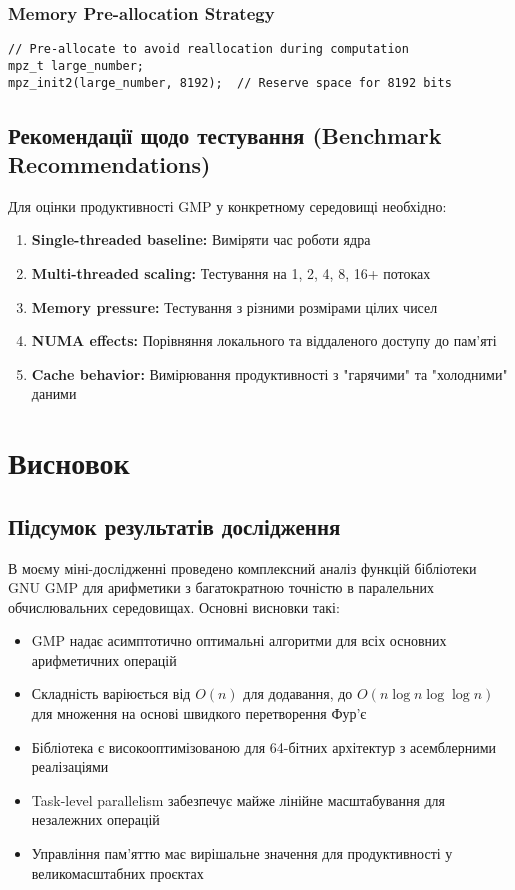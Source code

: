 \subsubsection{Memory Pre-allocation Strategy}
\begin{verbatim}
// Pre-allocate to avoid reallocation during computation
mpz_t large_number;
mpz_init2(large_number, 8192);  // Reserve space for 8192 bits
\end{verbatim}

\subsection{Рекомендації щодо тестування (Benchmark Recommendations)}

Для оцінки продуктивності GMP у конкретному середовищі необхідно:

\begin{enumerate}
    \item \textbf{Single-threaded baseline:} Виміряти час роботи ядра
    \item \textbf{Multi-threaded scaling:} Тестування на 1, 2, 4, 8, 16+ потоках
    \item \textbf{Memory pressure:} Тестування з різними розмірами цілих чисел
    \item \textbf{NUMA effects:} Порівняння локального та віддаленого доступу до пам'яті
    \item \textbf{Cache behavior:} Вимірювання продуктивності з "гарячими"{} та "холодними"{} даними
\end{enumerate}

\newpage
\section{Висновок}

\subsection{Підсумок результатів дослідження}
В моєму міні-дослідженні проведено комплексний аналіз функцій бібліотеки GNU GMP для арифметики з багатократною 
точністю в паралельних обчислювальних середовищах. Основні висновки такі:
\begin{itemize}
    \item GMP надає асимптотично оптимальні алгоритми для всіх основних арифметичних операцій
    \item Складність варіюється від $O(n)$ для додавання, до $O(n \log n \log \log n)$ для множення на основі швидкого перетворення Фур'є
    \item Бібліотека є високооптимізованою для 64-бітних архітектур з асемблерними реалізаціями
    \item Task-level parallelism забезпечує майже лінійне масштабування для незалежних операцій
    \item Управління пам'яттю має вирішальне значення для продуктивності у великомасштабних проєктах
\end{itemize}

